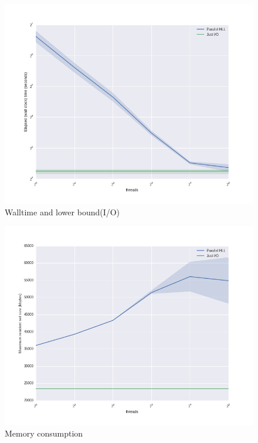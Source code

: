 \documentclass{bioinfo}
\begin{document}
\begin{figure}[!tpb]%
\centerline{\includegraphics[width=\textwidth]{figures/io_bound.png}}
\caption{Walltime and lower bound(I/O)}\label{fig:walltime}
\end{figure}

\begin{figure}[!tpb]%
\centerline{\includegraphics[width=\textwidth]{figures/mem_consumption.png}}
\caption{Memory consumption}\label{fig:mem}
\end{figure}
\end{document}
